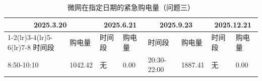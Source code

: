 \begin{table}[H]
\centering
{}
\begin{tabular}{llllllll}
\toprule
\multicolumn{2}{c}{2025.3.20} & \multicolumn{2}{c}{2025.6.21} & \multicolumn{2}{c}{2025.9.23} & \multicolumn{2}{c}{2025.12.21} \\
\cmidrule(lr){1-2}\cmidrule(lr){3-4}\cmidrule(lr){5-6}\cmidrule(lr){7-8}
时间段 & 购电量 & 时间段 & 购电量 & 时间段 & 购电量 & 时间段 & 购电量 \\
\midrule
8:50-10:10 & 1042.42 & 无 & 0.00 & 20:30-22:00 & 1887.41 & 无 & 0.00 \\
\bottomrule
\end{tabular}
\caption{微网在指定日期的紧急购电量（问题三）}
\label{tab:m3-q3}
\end{table}
\par{}
